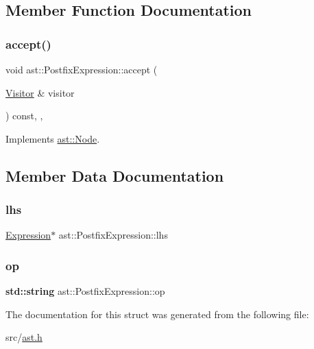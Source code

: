 \subsection{Member Function Documentation}
\mbox{\label{structast_1_1_postfix_expression_a4437b8f71db7d65b5a8b0126917065c1}} 
\subsubsection{\texorpdfstring{accept()}{accept()}}
{\footnotesize\ttfamily void ast\+::\+Postfix\+Expression\+::accept (\begin{DoxyParamCaption}\item[{\hyperlink{structast_1_1_visitor}{Visitor} \&}]{visitor }\end{DoxyParamCaption}) const\hspace{0.3cm}{\ttfamily [inline]}, {\ttfamily [override]}, {\ttfamily [virtual]}}



Implements \hyperlink{structast_1_1_node_abc089ee6caaf06a4445ebdd8391fdebc}{ast\+::\+Node}.



\subsection{Member Data Documentation}
\mbox{\label{structast_1_1_postfix_expression_ab98b86399ad2ee698117a00cf1457be1}} 
\subsubsection{\texorpdfstring{lhs}{lhs}}
{\footnotesize\ttfamily \hyperlink{structast_1_1_expression}{Expression}$\ast$ ast\+::\+Postfix\+Expression\+::lhs}

\mbox{\label{structast_1_1_postfix_expression_ad66faf9468db248029f996a097d26522}} 
\subsubsection{\texorpdfstring{op}{op}}
{\footnotesize\ttfamily \textbf{ std\+::string} ast\+::\+Postfix\+Expression\+::op}



The documentation for this struct was generated from the following file\+:\begin{DoxyCompactItemize}
\item 
src/\hyperlink{ast_8h}{ast.\+h}\end{DoxyCompactItemize}
